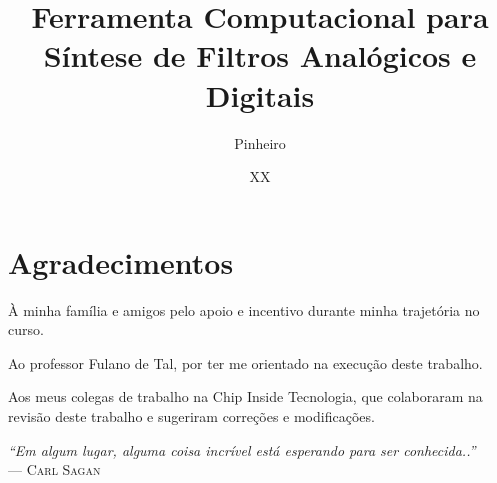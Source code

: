 \documentclass[tg]{mdtufsm}
\title{Ferramenta Computacional para Síntese de Filtros Analógicos e Digitais}
\author{Pinheiro}{Renan Birck}
\institute{Centro de Tecnologia}
\date{XX}{junho}{2015}
\begin{document}
\maketitle

\restoregeometry


\makeapprove


\chapter*{Agradecimentos}
À minha família e amigos pelo apoio e incentivo durante minha trajetória no curso.

Ao professor Fulano de Tal, por ter me orientado na execução deste trabalho.

Aos meus colegas de trabalho na Chip Inside Tecnologia, que colaboraram na revisão deste trabalho e sugeriram correções e modificações.

\clearpage
\begin{flushright}
\mbox{}\vfill
{\sffamily\itshape
``Em algum lugar, alguma coisa incrível está esperando para ser conhecida..'' \\ }
--- \textsc{Carl Sagan}
\end{flushright}
\end{document}
